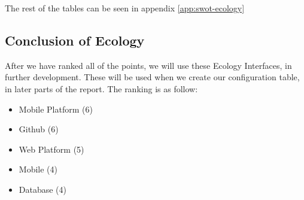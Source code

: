 The rest of the tables can be seen in appendix \ref{app:swot-ecology}

\subsection{Conclusion of Ecology}
After we have ranked all of the points, we will use these Ecology Interfaces, in further development.
These will be used when we create our configuration table, in later parts of the report.
The ranking is as follow:

\begin{itemize}
    \item Mobile Platform (6)
    \item Github (6)
    \item Web Platform (5)
    \item Mobile (4)
    \item Database (4)
\end{itemize}